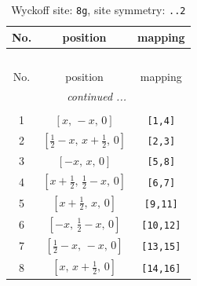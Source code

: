 \documentclass[fleqn,8pt]{jsarticle}
\begin{document}
\renewcommand{\arraystretch}{1.2}
\begin{longtable}{ccc}
\caption{Wyckoff site: {\tt 8g}, site symmetry: {\tt ..2}}
 \\
 \hline \hline
No. & position & mapping \\ \hline \endfirsthead

\multicolumn{2}{l}{\tablename\ \thetable{}} \\
 \hline \hline
No. & position & mapping \\ \hline \endhead

 \hline \hline
\multicolumn{2}{r}{\footnotesize\it continued ...} \\ \endfoot

 \hline \hline
\multicolumn{2}{r}{} \\ \endlastfoot

1 & $\left[ x,\, - x,\, 0 \right]$ & {\tt [1,4]} \\ \hline
2 & $\left[ \frac{1}{2} - x,\, x + \frac{1}{2},\, 0 \right]$ & {\tt [2,3]} \\ \hline
3 & $\left[ - x,\, x,\, 0 \right]$ & {\tt [5,8]} \\ \hline
4 & $\left[ x + \frac{1}{2},\, \frac{1}{2} - x,\, 0 \right]$ & {\tt [6,7]} \\ \hline
5 & $\left[ x + \frac{1}{2},\, x,\, 0 \right]$ & {\tt [9,11]} \\ \hline
6 & $\left[ - x,\, \frac{1}{2} - x,\, 0 \right]$ & {\tt [10,12]} \\ \hline
7 & $\left[ \frac{1}{2} - x,\, - x,\, 0 \right]$ & {\tt [13,15]} \\ \hline
8 & $\left[ x,\, x + \frac{1}{2},\, 0 \right]$ & {\tt [14,16]} \\
\end{longtable}
\renewcommand{\arraystretch}{1.2}
\end{document}
